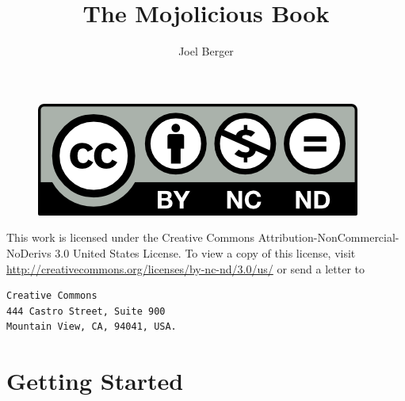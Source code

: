 \documentclass{book}
\title{The Mojolicious Book}
\author{Joel Berger}
\begin{document}
\maketitle

\newpage
\begin{figure}
  \centering
  \includegraphics{by-nc-nd}
\end{figure}
This work is licensed under the Creative Commons Attribution-NonCommercial-NoDerivs 3.0 United States License.
To view a copy of this license, visit \url{http://creativecommons.org/licenses/by-nc-nd/3.0/us/} or send a letter to
\begin{verbatim}
Creative Commons
444 Castro Street, Suite 900
Mountain View, CA, 94041, USA.
\end{verbatim}

\tableofcontents

\chapter{Getting Started}
  
    
\end{document}
